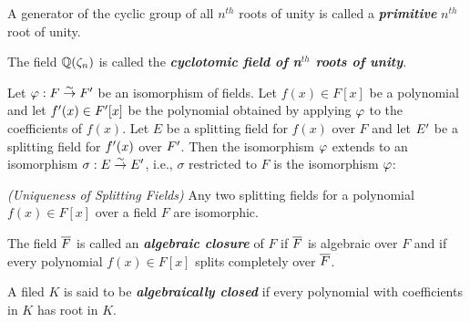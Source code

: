 \nl

\begin{defn}
A generator of the cyclic group of all $n^{th}$ roots of unity is called a \textit{\textbf{primitive}} $n^{th}$ root of unity.
\end{defn}

\nl

\begin{defn}
The field $\mathbb{Q}(\zeta_n)$ is called the \textit{\textbf{cyclotomic field of n$^{th}$ roots of unity}}.
\end{defn}

\nl

\begin{thm}
Let $\varphi: F\overset{\sim}{\rightarrow} F^\prime$ be an isomorphism of fields. Let $f(x)\in F[x]$ be a polynomial and let $f^\prime(x)\in F^\prime[x]$ be the polynomial obtained by applying $\varphi$ to the coefficients of $f(x)$. Let $E$ be a splitting field for $f(x)$ over $F$ and let $E^\prime$ be a splitting field for $f^\prime(x)$ over $F^\prime$. Then the isomorphism $\varphi$ extends to an isomorphism $\sigma: E\overset{\sim}{\rightarrow} E^\prime$, i.e., $\sigma$ restricted to $F$ is the isomorphism $\varphi$:
\begin{center}
\end{center}
\end{thm}

\nl

\begin{cor}\textit{(Uniqueness of Splitting Fields)}
Any two splitting fields for a polynomial $f(x)\in F[x]$ over a field $F$ are isomorphic.
\end{cor}

\nl

\begin{defn}
The field $\overline F$ is called an \textit{\textbf{algebraic closure}} of $F$ if $\overline F$ is algebraic over $F$ and if every polynomial $f(x)\in F[x]$ splits completely over $\overline F$.
\end{defn}

\nl

\begin{defn}
A filed $K$ is said to be \textit{\textbf{algebraically closed}} if every polynomial with coefficients in $K$ has root in $K$.
\end{defn}

